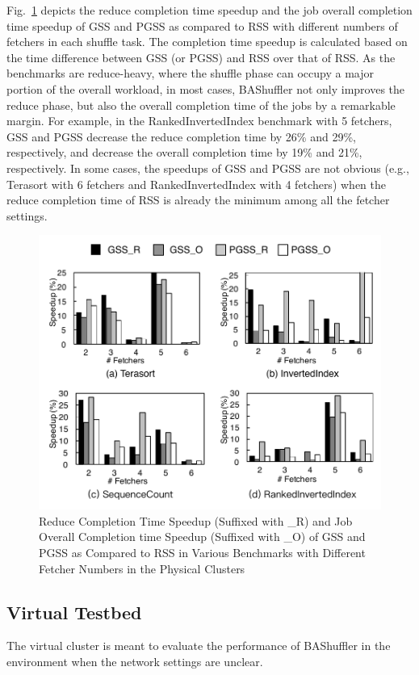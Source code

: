 \documentclass[10pt,journal,compsoc]{IEEEtran}
\begin{document}
Fig.~\ref{fig:new_speedup} depicts the reduce completion time speedup
and the job overall completion time speedup of GSS and PGSS as
compared to RSS with different numbers of fetchers in each shuffle
task.
The completion time speedup is calculated based on the time difference between GSS (or PGSS) and RSS over that of RSS. 
As the benchmarks are reduce-heavy, where the shuffle phase can occupy
a major portion of the overall workload, in most cases, BAShuffler not
only improves the reduce phase, but also the overall
completion time of the jobs by a remarkable margin.
For example, in the RankedInvertedIndex benchmark with 5 fetchers, 
GSS and PGSS decrease the reduce completion time by 26\% and 29\%, respectively, 
and decrease the overall completion time by 19\% and 21\%, respectively.  
In some cases, the speedups of GSS and PGSS are not obvious (e.g.,
Terasort with 6 fetchers and RankedInvertedIndex with 4 fetchers) when
the reduce completion time of RSS is already the minimum among all the
fetcher settings.


\begin{figure}[!t]
\centering
\includegraphics[width=1\columnwidth]{figure8}
\caption{Reduce Completion Time Speedup (Suffixed with \_R) and Job Overall Completion time Speedup (Suffixed with \_O) of GSS and PGSS as Compared to RSS in Various Benchmarks with Different Fetcher Numbers
in the Physical Clusters}
\label{fig:new_speedup}
\end{figure}

\subsection{Virtual Testbed}
The virtual cluster is meant to evaluate the performance of BAShuffler in the environment when the network settings are unclear. 
\end{document}
